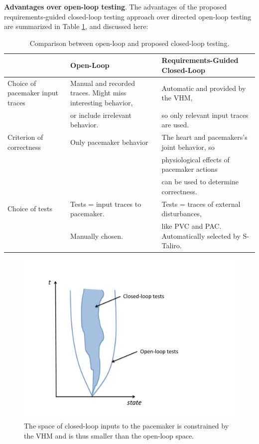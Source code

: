 \textbf{Advantages over open-loop testing}.
The advantages of the proposed requirements-guided closed-loop testing approach over directed open-loop testing are summarized in Table \ref{table:CLoverOL}, and discussed here:
\begin{table}
	\centering
	\caption{Comparison between open-loop and proposed closed-loop testing.}
	\begin{tabular}{|l|l|l|}
	\hline                       & Open-Loop    & Requirements-Guided Closed-Loop 
	\\ 
	\hline Choice of pacemaker input traces  
	                & Manual and recorded traces. Might miss interesting behavior, &  Automatic and provided by the VHM,
	\\ 
					& or include irrelevant behavior. &  so only relevant input traces are used.
	\\
	\hline Criterion of correctness    & Only pacemaker behavior & The heart and pacemakers's joint behavior, so 
	\\
	                &                  & physiological effects of pacemaker actions
	\\
	                &                  &  can be used to determine correctness.                   
	\\ 
	\hline Choice of tests & Tests = input traces to pacemaker.  & Tests = traces of external disturbances, 
	\\
	                & Manually chosen.  & like PVC and PAC. Automatically selected by S-Taliro.
	\\
	\hline 
\end{tabular}
\label{table:CLoverOL}
\end{table}

\begin{figure}[t]
\centering
\includegraphics[scale=0.3]{figures/cone}
\caption{The space of closed-loop inputs to the pacemaker is constrained by the VHM and is thus smaller than the open-loop space.}
\label{fig:cone}
\vspace{-.2cm}
\end{figure}

